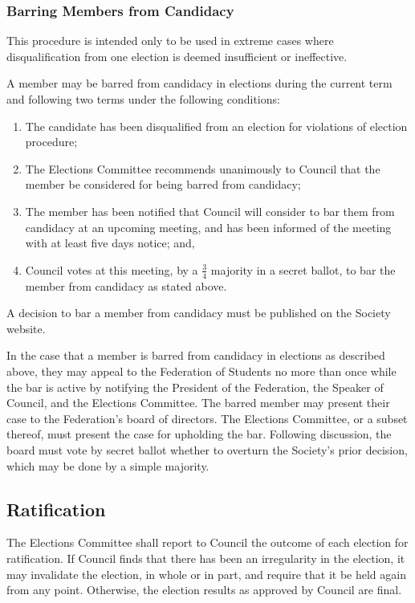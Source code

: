 \subsubsection{Barring Members from Candidacy}
This procedure is intended only to be used in extreme cases where disqualification from one election is deemed insufficient or ineffective.

A member may be barred from candidacy in elections during the current term and following two terms under the following conditions:
\begin{enumerate}
    \item The candidate has been disqualified from an election for violations of election procedure; %
    \item The Elections Committee recommends unanimously to Council that the member be considered for being barred from candidacy;
    \item The member has been notified that Council will consider to bar them from candidacy at an upcoming meeting, and has been informed of the meeting with at least five days notice; and,
    \item Council votes at this meeting, by a $\frac34$ majority in a secret ballot, to bar the member from candidacy as stated above.
\end{enumerate}
A decision to bar a member from candidacy must be published on the Society website.

In the case that a member is barred from candidacy in elections as described above, they may appeal to the Federation of Students no more than once while the bar is active by notifying the President of the Federation, the Speaker of Council, and the Elections Committee. The barred member may present their case to the Federation's board of directors. The Elections Committee, or a subset thereof, must present the case for upholding the bar. Following discussion, the board must vote by secret ballot whether to overturn the Society's prior decision, which may be done by a simple majority.

\subsection{Ratification}
The Elections Committee shall report to Council the outcome of each election for ratification.
If Council finds that there has been an irregularity in the election, it may invalidate the election, in whole or in part, and require that it be held again from any point.
Otherwise, the election results as approved by Council are final.

